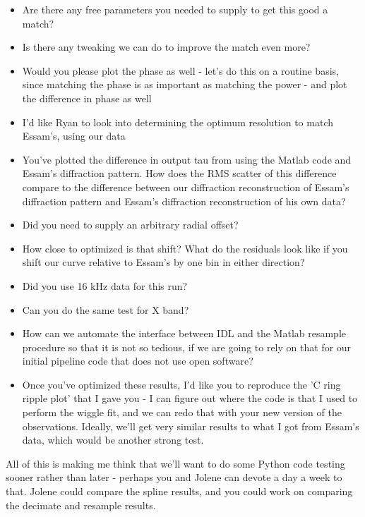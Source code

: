 \documentclass[crop=false,class=book]{standalone}
\begin{document}
\begin{itemize}
    \item Are there any free parameters you needed to supply to get this good a match?
    \item Is there any tweaking we can do to improve the match even more?
    \item Would you please plot the phase as well - let's do this on a routine basis, since matching the phase is as important as matching the power - and plot the difference in phase as well
    \item I'd like Ryan to look into determining the optimum resolution to match Essam's, using our data
    \item You've plotted the difference in output tau from using the Matlab code and Essam's diffraction pattern. How does the RMS scatter of this difference compare to the difference between our diffraction reconstruction of Essam's diffraction pattern and Essam's diffraction reconstruction of his own data?
    \item Did you need to supply an arbitrary radial offset? 
    \item How close to optimized is that shift? What do the residuals look like if you shift our curve relative to Essam's by one bin in either direction?
    \item Did you use 16 kHz data for this run?
    \item Can you do the same test for X band?
    \item How can we automate the interface between IDL and the Matlab resample procedure so that it is not so tedious, if we are going to rely on that for our initial pipeline code that does not use open software?
    \item Once you've optimized these results, I'd like you to reproduce the 'C ring ripple plot' that I gave you - I can figure out where the code is that I used to perform the wiggle fit, and we can redo that with your new version of the observations. Ideally, we'll get very similar results to what I got from Essam's data, which would be another strong test.
\end{itemize}
All of this is making me think that we'll want to do some Python code testing sooner rather than later - perhaps you and Jolene can devote a day a week to that.  Jolene could compare the spline results, and you could work on comparing the decimate and resample results.
\end{document}
